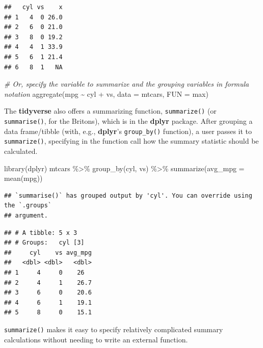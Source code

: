 \documentclass[
]{book}
\newenvironment{Shaded}{\begin{snugshade}}{\end{snugshade}}
\newcommand{\AttributeTok}[1]{\textcolor[rgb]{0.77,0.63,0.00}{#1}}
\newcommand{\CommentTok}[1]{\textcolor[rgb]{0.56,0.35,0.01}{\textit{#1}}}
\newcommand{\FunctionTok}[1]{\textcolor[rgb]{0.00,0.00,0.00}{#1}}
\newcommand{\NormalTok}[1]{#1}
\newcommand{\SpecialCharTok}[1]{\textcolor[rgb]{0.00,0.00,0.00}{#1}}
\begin{document}
\begin{verbatim}
##   cyl vs    x
## 1   4  0 26.0
## 2   6  0 21.0
## 3   8  0 19.2
## 4   4  1 33.9
## 5   6  1 21.4
## 6   8  1   NA
\end{verbatim}

\begin{Shaded}
\begin{Highlighting}[]
\CommentTok{\# Or, specify the variable to summarize and the grouping variables in formula notation}
\FunctionTok{aggregate}\NormalTok{(mpg }\SpecialCharTok{\textasciitilde{}}\NormalTok{ cyl }\SpecialCharTok{+}\NormalTok{ vs, }\AttributeTok{data =}\NormalTok{ mtcars, }\AttributeTok{FUN =}\NormalTok{ max)}
\end{Highlighting}
\end{Shaded}

The \textbf{tidyverse} also offers a summarizing function, \texttt{summarize()} (or \texttt{summarise()}, for the Britons), which is in the \textbf{dplyr} package. After grouping a data frame/tibble (with, e.g., \textbf{dplyr}'s \texttt{group\_by()} function), a user passes it to \texttt{summarize()}, specifying in the function call how the summary statistic should be calculated.

\begin{Shaded}
\begin{Highlighting}[]
\FunctionTok{library}\NormalTok{(dplyr)}
\NormalTok{mtcars }\SpecialCharTok{\%\textgreater{}\%} 
  \FunctionTok{group\_by}\NormalTok{(cyl, vs) }\SpecialCharTok{\%\textgreater{}\%} 
  \FunctionTok{summarize}\NormalTok{(}\AttributeTok{avg\_mpg =} \FunctionTok{mean}\NormalTok{(mpg))}
\end{Highlighting}
\end{Shaded}

\begin{verbatim}
## `summarise()` has grouped output by 'cyl'. You can override using the `.groups`
## argument.
\end{verbatim}

\begin{verbatim}
## # A tibble: 5 x 3
## # Groups:   cyl [3]
##     cyl    vs avg_mpg
##   <dbl> <dbl>   <dbl>
## 1     4     0    26  
## 2     4     1    26.7
## 3     6     0    20.6
## 4     6     1    19.1
## 5     8     0    15.1
\end{verbatim}

\texttt{summarize()} makes it easy to specify relatively complicated summary calculations without needing to write an external function.
\end{document}
